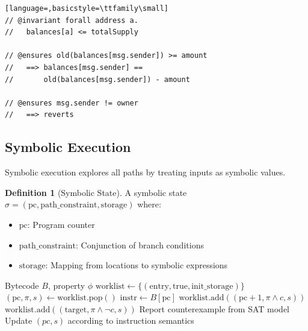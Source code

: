 \documentclass[11pt,a4paper]{article}
\theoremstyle{definition}
\newtheorem{definition}{Definition}
\begin{document}
\begin{lstlisting}[language=,basicstyle=\ttfamily\small]
// @invariant forall address a.
//   balances[a] <= totalSupply

// @ensures old(balances[msg.sender]) >= amount
//   ==> balances[msg.sender] ==
//       old(balances[msg.sender]) - amount

// @ensures msg.sender != owner
//   ==> reverts
\end{lstlisting}

\subsection{Symbolic Execution}

Symbolic execution explores all paths by treating inputs as symbolic values.

\begin{definition}[Symbolic State]
A symbolic state $\sigma = (\text{pc}, \text{path\_constraint}, \text{storage})$ where:
\begin{itemize}
    \item $\text{pc}$: Program counter
    \item $\text{path\_constraint}$: Conjunction of branch conditions
    \item $\text{storage}$: Mapping from locations to symbolic expressions
\end{itemize}
\end{definition}

\begin{algorithm}
\caption{Symbolic Execution for Property Verification}
\begin{algorithmic}[1]
\Require Bytecode $B$, property $\phi$
\State $\text{worklist} \gets \{(\text{entry}, \text{true}, \text{init\_storage})\}$
    \State $(\text{pc}, \pi, s) \gets \text{worklist.pop}()$
    \State $\text{instr} \gets B[\text{pc}]$
        \State $\text{worklist.add}((\text{pc}+1, \pi \land c, s))$
        \State $\text{worklist.add}((\text{target}, \pi \land \neg c, s))$
            \State Report counterexample from SAT model
        \EndIf
    \Else
        \State Update $(pc, s)$ according to instruction semantics
    \EndIf
\EndWhile
\end{algorithmic}
\end{algorithm}
\end{document}
